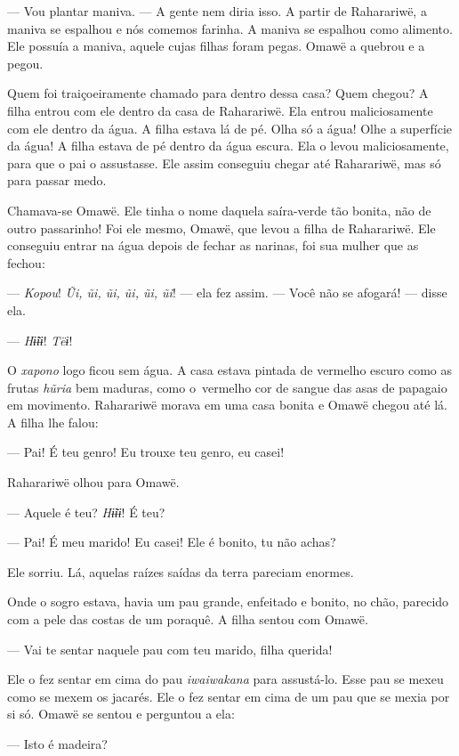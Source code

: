 --- Vou plantar maniva. --- A gente nem diria isso. A partir de
Raharariwë, a maniva se espalhou e nós comemos farinha. A maniva se
espalhou como alimento. Ele possuía a maniva, aquele cujas filhas foram
pegas. Omawë a quebrou e a pegou.

Quem foi traiçoeiramente chamado para dentro dessa casa? Quem chegou? A
filha entrou com ele dentro da casa de Raharariwë. Ela
entrou maliciosamente com ele dentro da água. A filha estava lá de pé.
Olha só a água! Olhe a superfície da água! A filha estava de pé dentro
da água escura. Ela o levou maliciosamente, para que o pai o assustasse.
Ele assim conseguiu chegar até Raharariwë, mas só para passar medo. 

Chamava-se Omawë. Ele tinha o nome daquela saíra-verde tão bonita, não
de outro passarinho! Foi ele mesmo, Omawë, que levou a filha de
Raharariwë. Ele conseguiu entrar na água depois de fechar as narinas,
foi sua mulher que as fechou:

--- \textit{Kopou}! \textit{Ũi, ũi, ũi, ũi, ũi, ũi}! --- ela fez assim. --- Você não se
afogará! --- disse ela. 

--- \textit{Hɨ̃ɨɨ}! \textit{Tëɨ}! 

O \textit{xapono} logo ficou sem água. A casa estava pintada de vermelho escuro como
as frutas \textit{hũria} bem maduras, como o~vermelho cor de sangue das
asas de papagaio em movimento. Raharariwë morava em uma casa bonita e
Omawë chegou até lá. A filha lhe falou:

--- Pai! É teu genro! Eu trouxe teu genro, eu casei! 

Raharariwë olhou para Omawë. 

--- Aquele é teu? \textit{Hɨ̃ɨɨ}! É teu?

--- Pai! É meu marido! Eu casei! Ele é bonito, tu não achas? 

Ele sorriu. Lá, aquelas raízes saídas da terra pareciam enormes.

Onde o sogro estava, havia um pau grande, enfeitado e bonito, no chão,
parecido com a pele das costas de um poraquê. A filha sentou com Omawë.

--- Vai te sentar naquele pau com teu marido, filha
querida! 

Ele o fez sentar em cima do pau \textit{iwaiwakana} para assustá-lo. Esse
pau se mexeu como se mexem os jacarés. Ele o fez sentar em cima de um
pau que se mexia por si só. Omawë se sentou e perguntou a ela: 

--- Isto é madeira?

